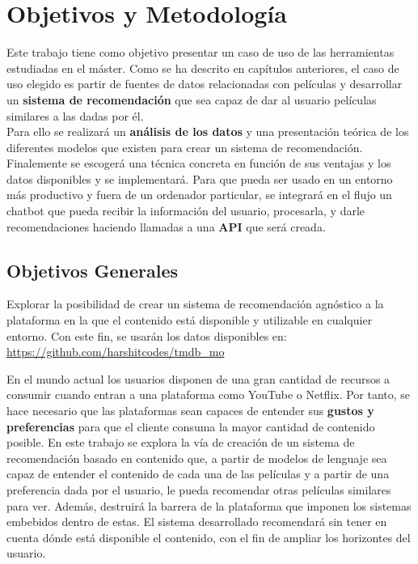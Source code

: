 \chapter{Objetivos y Metodología}\label{chap:objetivos}

Este trabajo tiene como objetivo presentar un caso de uso de las herramientas estudiadas en el máster. Como se ha descrito en capítulos anteriores, el caso de uso elegido es partir de fuentes de datos relacionadas con películas y desarrollar un \textbf{sistema de recomendación} que sea capaz de dar al usuario películas similares a las dadas por él.\\

Para ello se realizará un \textbf{análisis de los datos} y una presentación teórica de los diferentes modelos que existen para crear un sistema de recomendación. Finalemente se escogerá una técnica concreta en función de sus ventajas y los datos disponibles y se implementará. Para que pueda ser usado en un entorno más productivo y fuera de un ordenador particular, se integrará en el flujo un chatbot que pueda recibir la información del usuario, procesarla, y darle recomendaciones haciendo llamadas a una \textbf{API} que será creada.



\section{Objetivos Generales}\label{sec:objgenerales}

Explorar la posibilidad de crear un sistema de recomendación agnóstico a la plataforma en la que el contenido está disponible y utilizable en cualquier entorno. Con este fin, se usarán los datos disponibles en: \url{https://github.com/harshitcodes/tmdb_mo}

En el mundo actual los usuarios disponen de una gran cantidad de recursos a consumir cuando entran a una plataforma como YouTube o Netflix. Por tanto, se hace necesario que las plataformas sean capaces de entender sus \textbf{gustos y preferencias} para que el cliente consuma la mayor cantidad de contenido posible. En este trabajo se explora la vía de creación de un sistema de recomendación basado en contenido que, a partir de modelos de lenguaje sea capaz de entender el contenido de cada una de las películas y a partir de una preferencia dada por el usuario, le pueda recomendar otras películas similares para ver. Además, destruirá la barrera de la plataforma que imponen los sistemas embebidos dentro de estas. El sistema desarrollado recomendará sin tener en cuenta dónde está disponible el contenido, con el fin de ampliar los horizontes del usuario.\\

